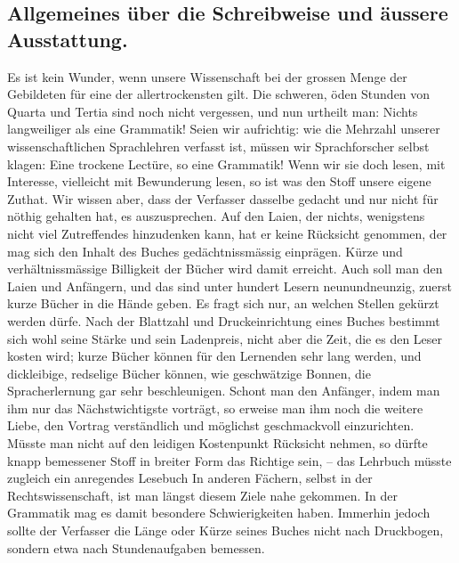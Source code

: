 \subsection*{Allgemeines über die Schreibweise und äussere Ausstattung.}

Es ist kein Wunder, wenn unsere Wissenschaft bei der grossen Menge der Gebildeten für eine der allertrockensten gilt. Die schweren, öden Stunden von Quarta und Tertia sind noch nicht vergessen, und nun urtheilt man: Nichts langweiliger als eine Grammatik! Seien wir aufrichtig: wie die Mehrzahl unserer wissenschaftlichen Sprachlehren verfasst ist, müssen wir Sprachforscher selbst klagen: Eine trockene Lectüre, so eine Grammatik! Wenn wir sie doch lesen, mit Interesse, vielleicht mit Bewunderung lesen, so ist  was den Stoff  unsere eigene Zuthat. Wir wissen aber, dass der Verfasser dasselbe gedacht und nur nicht für nöthig gehalten hat, es auszusprechen. Auf den Laien, der nichts, wenigstens nicht viel Zutreffendes hinzudenken kann, hat er keine Rücksicht genommen, der mag sich den Inhalt des Buches gedächtnissmässig einprägen. Kürze und verhältnissmässige Billigkeit der Bücher wird damit erreicht. Auch soll man den Laien und Anfängern, und das sind unter hundert Lesern neunundneunzig, zuerst kurze Bücher in die Hände geben. Es fragt sich nur, an welchen Stellen gekürzt werden dürfe. Nach der Blattzahl und Druckeinrichtung eines Buches bestimmt sich wohl seine Stärke und sein Ladenpreis, nicht aber die Zeit, die es den Leser kosten wird; kurze Bücher können für den Lernenden sehr lang werden, und dickleibige, redselige Bücher können, wie geschwätzige Bonnen, die Spracherlernung gar sehr beschleunigen. Schont man den Anfänger, indem man ihm nur das Nächstwichtigste vorträgt, \label{sp.108} so erweise man ihm noch die weitere Liebe, den Vortrag verständlich und möglichst geschmackvoll einzurichten. Müsste man nicht auf den leidigen Kostenpunkt Rücksicht nehmen, so dürfte knapp bemessener \label{fp.113} Stoff in breiter Form das Richtige sein, – das Lehrbuch müsste zugleich ein anregendes Lesebuch   In anderen Fächern, selbst in der Rechtswissenschaft, ist man längst diesem Ziele nahe gekommen. In der Grammatik mag es damit besondere Schwierigkeiten haben. Immerhin jedoch sollte der Verfasser die Länge oder Kürze seines Buches nicht nach Druckbogen, sondern etwa nach Stundenaufgaben bemessen.

